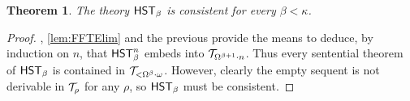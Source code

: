 \documentclass[UKenglish,cleveref,DIV=12]{scrartcl}
\newtheorem{theorem}{Theorem}
\theoremstyle{definition}
\theoremstyle{definition}
\begin{document}
\begin{theorem}\label{thm:FFconsis}
 The theory $\mathsf{HST}_\beta$ is consistent for every $\beta<\kappa$.
\end{theorem}
\begin{proof}
, \cref{lem:FFTElim} and the previous  provide the means to deduce, by induction on $n$, that $\mathsf{HST}_\beta^n$ embeds into $\mathcal{T}_{\Omega^{\beta+1}\cdot n}$. Thus every sentential theorem of $\mathsf{HST}_\beta$ is contained in $\mathcal{T}_{<\Omega^\beta\cdot\omega}$. However, clearly the empty sequent is not derivable in $\mathcal{T}_\rho$ for any $\rho$, so $\mathsf{HST}_\beta$ must be consistent.
\end{proof}
%
\end{document}
